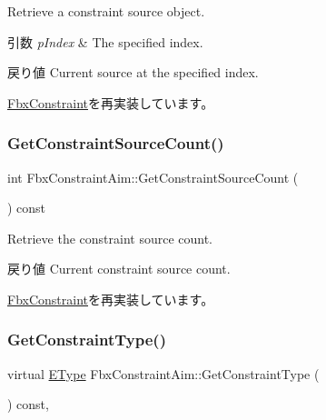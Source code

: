 Retrieve a constraint source object. 
\begin{DoxyParams}{引数}
{\em p\+Index} & The specified index. \\
\hline
\end{DoxyParams}
\begin{DoxyReturn}{戻り値}
Current source at the specified index. 
\end{DoxyReturn}


\hyperlink{class_fbx_constraint_a5ff6fe6fc98af1e33e8b297bc1cea007}{Fbx\+Constraint}を再実装しています。

\mbox{\label{class_fbx_constraint_aim_aa58f34b660f30caff3f89c5372a25a5c}} 
\subsubsection{\texorpdfstring{Get\+Constraint\+Source\+Count()}{GetConstraintSourceCount()}}
{\footnotesize\ttfamily int Fbx\+Constraint\+Aim\+::\+Get\+Constraint\+Source\+Count (\begin{DoxyParamCaption}{ }\end{DoxyParamCaption}) const\hspace{0.3cm}{\ttfamily [virtual]}}

Retrieve the constraint source count. \begin{DoxyReturn}{戻り値}
Current constraint source count. 
\end{DoxyReturn}


\hyperlink{class_fbx_constraint_aa702f86c6a1832ce3b4905911e66c58f}{Fbx\+Constraint}を再実装しています。

\mbox{\label{class_fbx_constraint_aim_a061ee3079d1182fa2e1a5eeebff01b15}} 
\subsubsection{\texorpdfstring{Get\+Constraint\+Type()}{GetConstraintType()}}
{\footnotesize\ttfamily virtual \hyperlink{class_fbx_constraint_a49c1634663395eab7c28856df233ec66}{E\+Type} Fbx\+Constraint\+Aim\+::\+Get\+Constraint\+Type (\begin{DoxyParamCaption}{ }\end{DoxyParamCaption}) const\hspace{0.3cm}{\ttfamily [protected]}, {\ttfamily [virtual]}}

